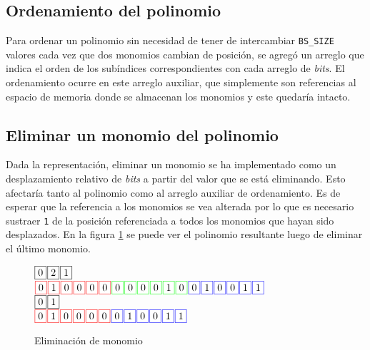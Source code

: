 \subsection{Ordenamiento del polinomio}

Para ordenar un polinomio sin necesidad de tener de intercambiar \texttt{BS\_SIZE} valores cada vez que dos monomios cambian de posición, se agregó un arreglo que indica el orden de los subíndices correspondientes con cada arreglo de \textit{bits}. El ordenamiento ocurre en este arreglo auxiliar, que simplemente son referencias al espacio de memoria donde se almacenan los monomios y este quedaría intacto.

\subsection{Eliminar un monomio del polinomio}

Dada la representación, eliminar un monomio se ha implementado como un desplazamiento relativo de \textit{bits} a partir del valor que se está eliminando. Esto afectaría tanto al polinomio como al arreglo auxiliar de ordenamiento. Es de esperar que la referencia a los monomios se vea alterada por lo que es necesario sustraer \texttt{1} de la posición referenciada a todos los monomios que hayan sido desplazados. En la figura \ref{fig:p_e} se puede ver el polinomio resultante luego de eliminar el último monomio.

\vspace{-1.5em}

\begin{figure}[!ht]
    \centering
    \begin{minipage}[c][3.5cm][b]{.65\textwidth}
    \noindent
    $\fbox{0} \hspace*{.1em} \fbox{2} \hspace*{.1em} \fbox{1}$\ \\
    \noindent
    $\fcolorbox{red}{white}{0} \sep \fcolorbox{red}{white}{1} \sep \fcolorbox{red}{white}{0} \sep \fcolorbox{red}{white}{0} \sep \fcolorbox{red}{white}{0} \sep \fcolorbox{red}{white}{0} \sep \fcolorbox{green}{white}{0} \sep \fcolorbox{green}{white}{0} \sep \fcolorbox{green}{white}{0} \sep \fcolorbox{green}{white}{0} \sep \fcolorbox{green}{white}{1} \sep \fcolorbox{green}{white}{0} \sep \fcolorbox{blue}{white}{0} \sep \fcolorbox{blue}{white}{1} \sep \fcolorbox{blue}{white}{0} \sep \fcolorbox{blue}{white}{0} \sep \fcolorbox{blue}{white}{1} \sep \fcolorbox{blue}{white}{1}$\ \\
    \noindent
    $\fbox{0} \hspace*{.1em} \fbox{1}$\ \\
    \noindent
    $\fcolorbox{red}{white}{0} \sep \fcolorbox{red}{white}{1} \sep \fcolorbox{red}{white}{0} \sep \fcolorbox{red}{white}{0} \sep \fcolorbox{red}{white}{0} \sep \fcolorbox{red}{white}{0} \sep \fcolorbox{blue}{white}{0} \sep \fcolorbox{blue}{white}{1} \sep \fcolorbox{blue}{white}{0} \sep \fcolorbox{blue}{white}{0} \sep \fcolorbox{blue}{white}{1} \sep \fcolorbox{blue}{white}{1}$
    \end{minipage}
\caption{Eliminación de monomio}
\label{fig:p_e}
\end{figure}


